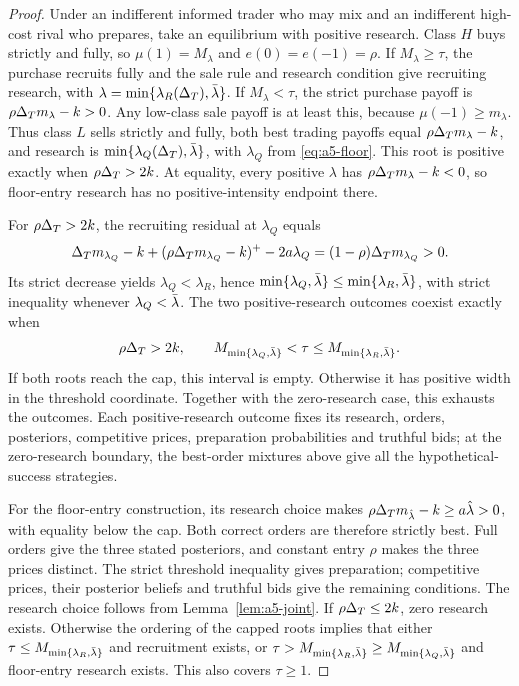 \begin{proof}
Under an indifferent informed trader who may mix and an indifferent high-cost rival who prepares, take an
equilibrium with positive research. Class \(H\) buys strictly and fully, so \(\mu(1)=M_\lambda\) and
\(e(0)=e(-1)=\rho\). If \(M_\lambda\ge\tau\), the purchase recruits fully and the sale rule and research
condition give recruiting research, with \(\lambda=\min\{\lambda_R(\Delta_T),\bar\lambda\}\).
If \(M_\lambda<\tau\), the strict purchase payoff is \(\rho\Delta_T m_\lambda-k>0\). Any low-class sale payoff is
at least this, because \(\mu(-1)\ge m_\lambda\). Thus class \(L\) sells strictly and fully, both best trading
payoffs equal \(\rho\Delta_T m_\lambda-k\), and research is
\(\min\{\lambda_Q(\Delta_T),\bar\lambda\}\), with \(\lambda_Q\) from \eqref{eq:a5-floor}.
This root is positive exactly when \(\rho\Delta_T>2k\). At equality, every positive \(\lambda\) has
\(\rho\Delta_T m_\lambda-k<0\), so floor-entry research has no positive-intensity endpoint there.

For \(\rho\Delta_T>2k\), the recruiting residual at \(\lambda_Q\) equals
\[
 \Delta_T m_{\lambda_Q}-k+(\rho\Delta_T m_{\lambda_Q}-k)^+-2a\lambda_Q
 =(1-\rho)\Delta_T m_{\lambda_Q}>0.
\]
Its strict decrease yields \(\lambda_Q<\lambda_R\), hence
\(\min\{\lambda_Q,\bar\lambda\}\le\min\{\lambda_R,\bar\lambda\}\), with strict inequality whenever \(\lambda_Q<\bar\lambda\).
The two positive-research outcomes coexist exactly when
\[
 \rho\Delta_T>2k,\qquad
 M_{\min\{\lambda_Q,\bar\lambda\}}<\tau\le M_{\min\{\lambda_R,\bar\lambda\}}.
\]
If both roots reach the cap, this interval is empty. Otherwise it has positive width in the threshold
coordinate. Together with the zero-research case, this exhausts the outcomes. Each positive-research outcome
fixes its research, orders, posteriors, competitive prices, preparation probabilities and truthful bids;
at the zero-research boundary, the best-order mixtures above give all the hypothetical-success strategies.

For the floor-entry construction, its research choice makes
\(\rho\Delta_T m_{\hat\lambda}-k\ge a\hat\lambda>0\), with equality below the cap.
Both correct orders are therefore strictly best. Full orders give the three stated posteriors, and constant
entry \(\rho\) makes the three prices distinct. The strict threshold inequality gives preparation;
competitive prices, their posterior beliefs and truthful bids give the remaining conditions. The research
choice follows from Lemma~\ref{lem:a5-joint}.
If \(\rho\Delta_T\le2k\), zero research exists. Otherwise the ordering of the capped roots implies that either
\(\tau\le M_{\min\{\lambda_R,\bar\lambda\}}\) and recruitment exists, or
\(\tau>M_{\min\{\lambda_R,\bar\lambda\}}\ge M_{\min\{\lambda_Q,\bar\lambda\}}\) and floor-entry research exists.
This also covers \(\tau\ge1\).
\end{proof}

